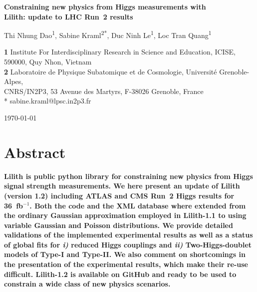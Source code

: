\documentclass[submission, Phys]{SciPost}
\begin{document}
\begin{center}{\Large \textbf{
  Constraining new physics from Higgs measurements with\\[1mm] Lilith: update to LHC Run~2 results}}\end{center}

\begin{center}
Thi Nhung Dao\textsuperscript{1},
Sabine Kraml\textsuperscript{2*},
Duc Ninh Le\textsuperscript{1},
Loc Tran Quang\textsuperscript{1}
\end{center}

\begin{center}
{\bf 1} Institute For Interdisciplinary Research in Science and Education, ICISE,\\ 590000, Quy Nhon, Vietnam\\
{\bf 2} Laboratoire de Physique Subatomique et de Cosmologie, Universit\'e Grenoble-Alpes,\\ CNRS/IN2P3, 53 Avenue des Martyrs, F-38026 Grenoble, France\\
* sabine.kraml@lpsc.in2p3.fr
\end{center}

\begin{center}
\today
\end{center}


\section*{Abstract}
{\bf
Lilith is public python library for constraining new physics from Higgs signal strength measurements. 
We here present an update of Lilith (version 1.2) including ATLAS and CMS Run~2 Higgs results for 36~fb$^{-1}$.  
Both the code and the XML database where extended from the ordinary Gaussian approximation employed in 
Lilith-1.1 to using variable Gaussian and Poisson distributions.  
We provide detailed validations of the implemented experimental results as well as 
a status of global fits for {\it i)} reduced Higgs couplings and {\it ii)} Two-Higgs-doublet models of Type-I and Type-II. 
We also comment on shortcomings in the presentation of the experimental results, which make their re-use difficult. 
Lilith-1.2 is available on GitHub and ready to be used to constrain a wide class of new physics scenarios.}
\end{document}
